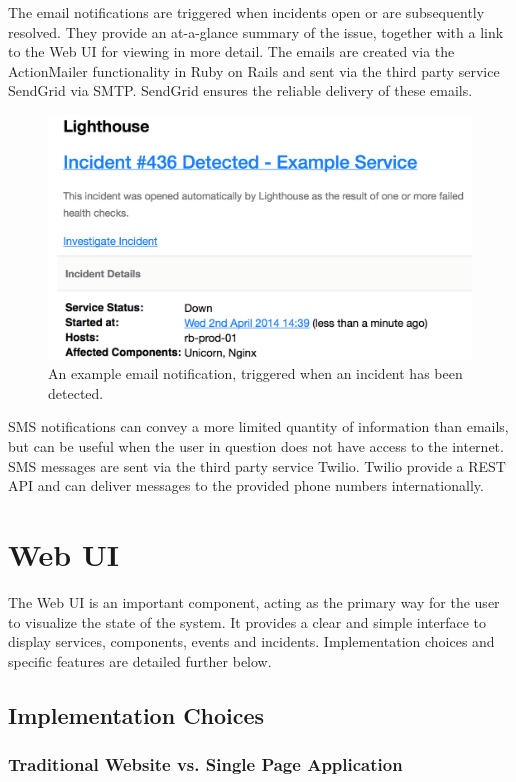 \documentclass{cshonours}
\begin{document}
The email notifications are triggered when incidents open or are subsequently resolved. They provide an at-a-glance summary of the issue, together with a link to the Web UI for viewing in more detail. The emails are created via the ActionMailer functionality in Ruby on Rails and sent via the third party service SendGrid via SMTP. SendGrid ensures the reliable delivery of these emails.

\begin{figure}[h]
\includegraphics[scale=0.6]{email.png}
\caption{An example email notification, triggered when an incident has been detected.}
\end{figure}

SMS notifications can convey a more limited quantity of information than emails, but can be useful when the user in question does not have access to the internet. SMS messages are sent via the third party service Twilio. Twilio provide a REST API and can deliver messages to the provided phone numbers internationally.

\pagebreak
\section{Web UI}

The Web UI is an important component, acting as the primary way for the user to visualize the state of the system. It provides a clear and simple interface to display services, components, events and incidents. Implementation choices and specific features are detailed further below.

\subsection{Implementation Choices}

\subsubsection{Traditional Website vs. Single Page Application}
\end{document}
